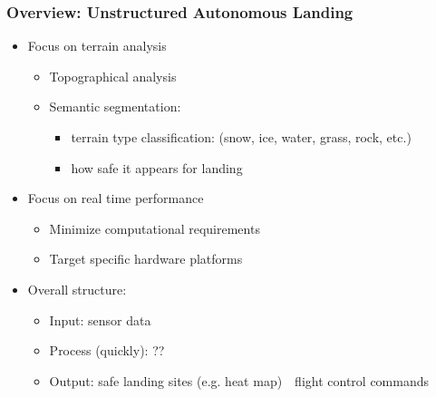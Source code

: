 \documentclass[aspectratio=169]{rubeamer}
\newif\ifpause
\newcommand{\mypause}{\ifpause \pause \fi}
\begin{document}
\begin{frame}
  \frametitle{Overview: Unstructured Autonomous Landing}
  \begin{itemize}
    \mypause
    \item Focus on terrain analysis
    \begin{itemize}
      \mypause
      \item Topographical analysis%
      \mypause
      \item Semantic segmentation\mypause:%
      \begin{itemize}
        \item terrain type classification: (snow, ice, water, grass, rock, etc.)
        \mypause
        \item how safe it appears for landing
      \end{itemize}
    \end{itemize}
    \mypause
    \item Focus on real time performance
    \begin{itemize}
      \mypause
      \item Minimize computational requirements
      \mypause
      \item Target specific hardware platforms
    \end{itemize}
    \mypause
    \item Overall structure:
    \begin{itemize}
      \item Input: sensor data
      \item Process (quickly): ??
      \item Output: safe landing sites (e.g. heat map)\mypause~\textrightarrow~flight control commands
    \end{itemize}

\end{itemize}
\end{frame}
\end{document}
